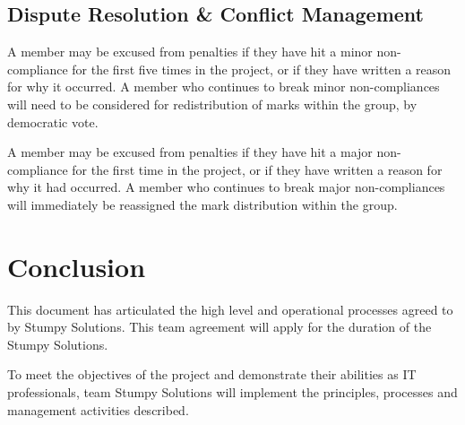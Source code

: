 \documentclass[12pt, a4paper, onecolumn]{article}
\begin{document}
\subsection{Dispute Resolution \& Conflict Management}
A member may be excused from penalties if
they have hit a minor non-compliance for the first five times in the project,
or if they have written a reason for why it occurred. A member who
continues to break minor non-compliances will need to be
considered for redistribution of marks within the group, by
democratic vote.

A member may be excused from penalties if they have hit a major non-compliance
for the first time in the project, or if they have written a reason for
why it had occurred. A member who continues to break major non-compliances
will immediately be reassigned the mark distribution within the group.


\newpage
\section{Conclusion}
This document has articulated the high level and operational
processes agreed to by Stumpy Solutions.  This team agreement
will apply for the duration of the Stumpy Solutions.

To meet the objectives of the project and demonstrate their
abilities as IT professionals, team Stumpy Solutions will implement
the principles, processes and management activities described.

\newpage
\begin{thebibliography}{9}
\end{thebibliography}
\end{document}
